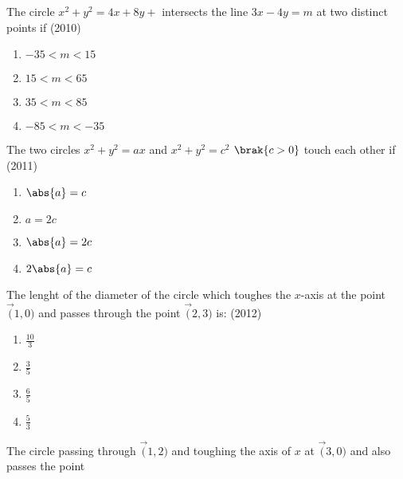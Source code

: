 
\iffalse
  \title{Assignment 1}
  \author{Jadhav Rajesh}
  \section{mains}
\fi

    \item The circle $x^2+y^2=4x+8y+$ intersects the line $3x-4y=m$ at two distinct points if
        \hfill(2010)
    \begin{enumerate}
            \item $-35<m<15$\\
            \item $15<m<65$\\
            \item $35<m<85$\\
            \item $-85<m<-35$\\
        \end{enumerate}
    \item The two circles $x^2+y^2=ax$ and $x^2+y^2=c^2$ $\brak{c>0}$ touch each other if
           \hfill(2011)
    \begin{enumerate}
        \item $\abs{a}=c$\\
        \item  $a=2c$\\
        \item $\abs{a}=2c$\\
        \item $2\abs{a}=c$\\
    \end{enumerate}
    \item The lenght of the diameter of the circle which toughes the $x$-axis at the point $\vec(1,0)$ and passes through the point $\vec(2,3)$ is:
        \hfill(2012)
    \begin{enumerate}
        \item$\frac{10}{3}$\\
        \item$\frac{3}{5}$\\
        \item$\frac{6}{5}$\\
        \item$\frac{5}{3}$\\
    \end{enumerate}
    \item The circle passing through $\vec(1,2)$ and toughing the axis of $x$ at $\vec(3,0)$ and also passes the point
